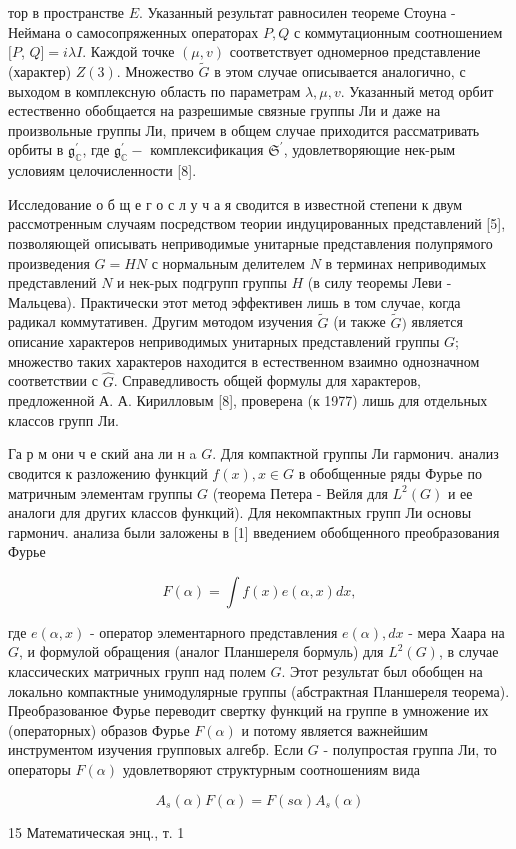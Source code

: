 \documentclass[10pt]{article}
\begin{document}
тор в пространстве $E$. Указанный результат равносилен теореме Стоуна - Неймана о самосопряженных операторах $P, Q$ с коммутационным соотношением $[P$, $Q]=i \lambda I$. Каждой точке $(\mu, v)$ соответствует одномерноө представление (характер) $Z(3)$. Множество $\tilde{G}$ в этом случае описывается аналогично, с выходом в комплексную область по параметрам $\lambda, \mu, v$. Указанный метод орбит естественно обобщается на разрешимые связные группы Ли и даже на произвольные группы Ли, причем в общем случае приходится рассматривать орбиты в $\mathfrak{g}_{\mathbb{C}}^{\prime}$, где $\mathfrak{g}_{\mathbb{C}}^{\prime}-$ комплексификация $\mathfrak{S}^{\prime}$, удовлетворяющие нек-рым условиям целочисленности [8].



Исследование о б щ е г о с л у ч а я сводится в известной степени к двум рассмотренным случаям посредством теории индуцированных представлений [5], позволяющей описывать неприводимые унитарные представления полупрямого произведения $G=H N$ с нормальным делителем $N$ в терминах неприводимых представлений $N$ и нек-рых подгрупп группы $H$ (в силу теоремы Леви - Мальцева). Практически этот метод эффективен лишь в том случае, когда радикал коммутативен. Другим мөтодом изучения $\tilde{G}$ (и также $\tilde{G})$ является описание характеров неприводимых унитарных представлений группы $G$; множество таких характеров находится в естественном взаимно однозначном соответствии с $\hat{G}$. Справедливость общей формулы для характеров, предложенной А. А. Кирилловым [8], проверена (к 1977) лишь для отдельных классов групп Ли.



Га р м они ч е ский ана ли н a $G$. Для компактной группы Ли гармонич. анализ сводится к разложению функций $f(x), x \in G$ в обобщенные ряды Фурье по матричным элементам группы $G$ (теорема Петера - Вейля для $L^{2}(G)$ и ее аналоги для других классов функций). Для некомпактных групп Ли основы гармонич. анализа были заложены в [1] введением обобщенного преобразования Фурье



\[

F(\alpha)=\int f(x) e(\alpha, x) d x,

\]



где $e(\alpha, x)$ - оператор элементарного представления $e(\alpha), d x$ - мера Хаара на $G$, и формулой обращения (аналог Планшереля бормуль) для $L^{2}(G)$, в случае классических матричных групп над полем $G$. Этот результат был обобщен на локально компактные унимодулярные группы (абстрактная Планшереля теорема). Преобразованюе Фурье переводит свертку функций на группе в умножение их (операторных) образов Фурье $F(\alpha)$ и потому является важнейшим инструментом изучения групповых алгебр. Если $G$ - полупростая группа Ли, то операторы $F(\alpha)$ удовлетворяют структурным соотношениям вида



\[

A_{s}(\alpha) F(\alpha)=F(s \alpha) A_{s}(\alpha)

\]



15 Математическая энц., т. 1
\end{document}
